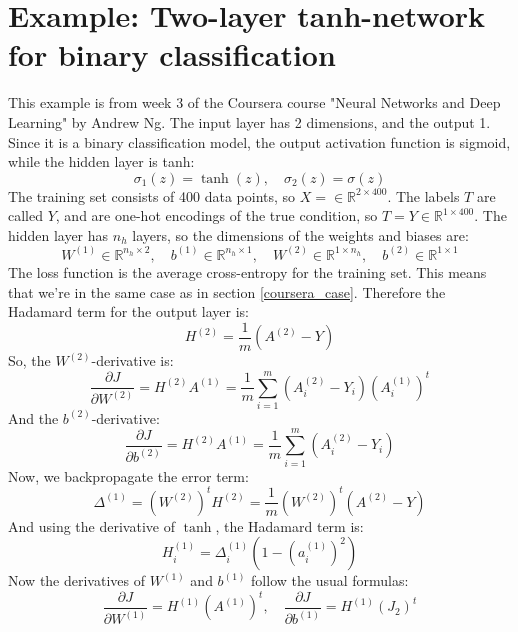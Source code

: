 \documentclass[12pt, a4paper]{article}
\numberwithin{equation}{section}
\begin{document}
\section{Example: Two-layer tanh-network for binary classification}
This example is from week 3 of the Coursera course "Neural Networks and Deep Learning" by Andrew Ng. The input layer has 2 dimensions, and the output 1. Since it is a binary classification model, the output activation function is sigmoid, while the hidden layer is tanh:
\begin{equation}
\sigma_1(z)=\tanh(z),\quad\sigma_2(z)=\sigma(z)
\end{equation}
The training set consists of 400 data points, so $X=\in\mathbb{R}^{2\times 400}$. The labels $T$ are called $Y$, and are one-hot encodings of the true condition, so $T=Y\in\mathbb{R}^{1\times 400}$.
The hidden layer has $n_h$ layers, so the dimensions of the weights and biases are:
\begin{equation}
W^{(1)}\in\mathbb{R}^{n_h\times 2},\quad b^{(1)}\in\mathbb{R}^{n_h\times 1},\quad
W^{(2)}\in\mathbb{R}^{1\times n_h},\quad b^{(2)}\in\mathbb{R}^{1\times 1}
\end{equation}
The loss function is the average cross-entropy for the training set. This means that we're in the same case as in section \ref{coursera_case}. Therefore the Hadamard term for the output layer is:
\begin{equation}
H^{(2)}=\frac{1}{m}(A^{(2)}-Y)
\end{equation}
So, the $W^{(2)}$-derivative is:
\begin{equation}
\frac{\partial J}{\partial W^{(2)}}=H^{(2)}A^{(1)}=\frac{1}{m}\sum_{i=1}^m\left(A^{(2)}_i-Y_i\right)(A^{(1)}_i)^t
\end{equation}
And the $b^{(2)}$-derivative:
\begin{equation}
\frac{\partial J}{\partial b^{(2)}}=H^{(2)}A^{(1)}=\frac{1}{m}\sum_{i=1}^m\left(A^{(2)}_i-Y_i\right)
\end{equation}
Now, we backpropagate the error term:
\begin{equation}
\Delta^{(1)}=(W^{(2)})^t H^{(2)}=\frac{1}{m}(W^{(2)})^t(A^{(2)}-Y)
\end{equation}
And using the derivative of $\tanh$, the Hadamard term is:
\begin{equation}
H^{(1)}_i=\Delta^{(1)}_i(1-(a^{(1)}_i)^2)
\end{equation}
Now the derivatives of $W^{(1)}$ and $b^{(1)}$ follow the usual formulas:
\begin{equation}
\frac{\partial J}{\partial W^{(1)}}=H^{(1)}(A^{(1)})^t,\quad
\frac{\partial J}{\partial b^{(1)}}=H^{(1)}(J_2)^t
\end{equation}
\end{document}
